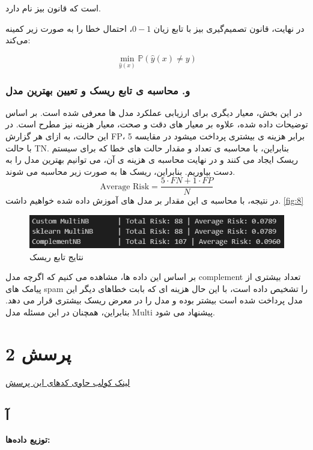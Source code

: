 \documentclass{article}
\begin{document}
است که قانون بیز نام دارد.

در نهایت، قانون تصمیم‌گیری بیز با تابع زیان $0-1$، احتمال خطا را به صورت زیر کمینه می‌کند:

\[
\min_{\hat{y}(x)} \mathbb{P}(\hat{y}(x) \neq y)
\]
\subsubsection{و. محاسبه ی تابع ریسک و تعیین بهترین مدل}
در این بخش، معیار دیگری برای ارزیابی عملکرد مدل ها معرفی شده است. بر اساس توضیحات داده شده، علاوه بر معیار های دقت و صحت، معیار هزینه نیز مطرح است. در این حالت، به ازای هر گزارش FP، 5 برابر هزینه ی بیشتری پرداخت میشود در مقایسه با حالت TN. بنابراین، با محاسبه ی تعداد و مقدار حالت های خطا که برای سیستم ریسک ایجاد می کنند و در نهایت محاسبه ی هزینه ی آن، می توانیم بهترین مدل را به دست بیاوریم.
بنابراین، ریسک ها به صورت زیر محاسبه می شوند. 
\begin{equation}
    \text{Average Risk} = \frac{5 \cdot FN + 1 \cdot FP}{N}
\end{equation}
در نتیجه، با محاسبه ی این مقدار بر مدل های آموزش داده شده خواهیم داشت. \autoref{fig:8}

\begin{figure}
    \centering
    \includegraphics[width=0.75\linewidth]{8.png}
    \caption{نتایج تابع ریسک}
    \label{fig:8}
\end{figure}

بر اساس این داده ها، مشاهده می کنیم که اگرچه مدل complement تعداد بیشتری از پیامک های spam را تشخیص داده است، با این حال هزینه ای که بابت خطاهای دیگر این مدل پرداخت شده است بیشتر بوده و مدل را در معرض ریسک بیشتری قرار می دهد. بنابراین، همچنان در این مسئله مدل Multi پیشنهاد می شود.
\clearpage

\section{پرسش 2}
\href{https://colab.research.google.com/drive/19MJwiHCgJhBfp4knr7LaBVy25tQZMQ3s}{لینک کولب حاوی کدهای این پرسش}



\subsection{آ}

\textbf{توزیع داده‌ها:}
\end{document}
